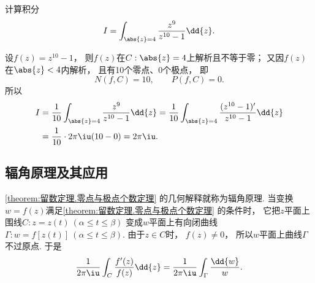\begin{example}
计算积分\begin{equation*}
	I = \int_{\abs{z}=4} \frac{z^9}{z^{10}-1} \dd{z}.
\end{equation*}
\begin{solution}
设\(f(z) = z^{10}-1\)，
则\(f(z)\)在\(C: \abs{z}=4\)上解析且不等于零；
又因\(f(z)\)在\(\abs{z}<4\)内解析，
且有10个零点、0个极点，
即\begin{equation*}
	N(f,C) = 10, \qquad P(f,C) = 0.
\end{equation*}
所以\begin{align*}
	I &= \frac{1}{10} \int_{\abs{z}=4} \frac{z^9}{z^{10}-1} \dd{z}
	= \frac{1}{10} \int_{\abs{z}=4} \frac{(z^{10}-1)'}{z^{10}-1} \dd{z} \\
	&= \frac{1}{10} \cdot 2\pi\iu (10-0) = 2\pi\iu.
\end{align*}
\end{solution}
\end{example}

\subsection{辐角原理及其应用}
\cref{theorem:留数定理.零点与极点个数定理} 的几何解释就称为辐角原理.
当变换\(w = f(z)\)满足\cref{theorem:留数定理.零点与极点个数定理} 的条件时，
它把\(z\)平面上围线\(C: z = z(t)\ (\alpha \leq t \leq \beta)\)
变成\(w\)平面上有向闭曲线\(\Gamma: w = f[z(t)]\ (\alpha \leq t \leq \beta)\).
由于\(z \in C\)时，
\(f(z)\neq0\)，
所以\(w\)平面上曲线\(\Gamma\)不过原点.
于是\begin{equation}\label{equation:留数定理.辐角原理及其应用1}
	\frac{1}{2\pi\iu} \int_C \frac{f'(z)}{f(z)} \dd{z}
	= \frac{1}{2\pi\iu} \int_\Gamma \frac{\dd{w}}{w}.
\end{equation}

